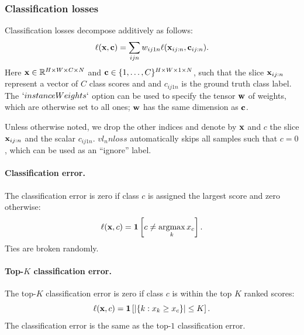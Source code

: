 \subsubsection{Classification losses}\label{s:loss-classification}

Classification losses decompose additively as follows:
\begin{equation}\label{e:addloss}
\ell(\mathbf{x},\mathbf{c}) = \sum_{ijn} w_{ij1n} \ell(\mathbf{x}_{ij:n}, \mathbf{c}_{ij:n}).
\end{equation}
Here $\mathbf{x} \in \mathbb{R}^{H \times W \times C \times N}$ and $\mathbf{c} \in \{1, \dots, C\}^{H \times W \times 1 \times N}$, such that the slice $\mathbf{x}_{ij:n}$ represent a vector of $C$ class scores and and $c_{ij1n}$ is the ground truth class label. The $`instanceWeights`$ option can be used to specify the tensor $\mathbf{w}$ of weights, which are otherwise set to all ones; $\mathbf{w}$ has the same dimension as $\mathbf{c}$.

Unless otherwise noted, we drop the other indices and denote by $\mathbf{x}$ and $c$  the slice $\mathbf{x}_{ij:n}$ and the scalar $c_{ij1n}$. $vl_nnloss$ automatically skips all samples such that $c=0$, which can be used as an ``ignore'' label.

\paragraph{Classification error.} The classification error is zero if class $c$ is assigned the largest score and zero otherwise:
\begin{equation}\label{e:loss-classerror}
\ell(\bx,c) = \mathbf{1}\left[c \not= \argmax_k x_c\right].
\end{equation}
Ties are broken randomly.

\paragraph{Top-$K$ classification error.} The top-$K$ classification error is zero if class $c$ is within the top $K$ ranked scores:
\begin{equation}\label{e:loss-classerror}
\ell(\mathbf{x},c) = \mathbf{1}\left[ |\{k : x_k \geq x_c \}| \leq K \right].
\end{equation}
The classification error is the same as the top-$1$ classification error.

